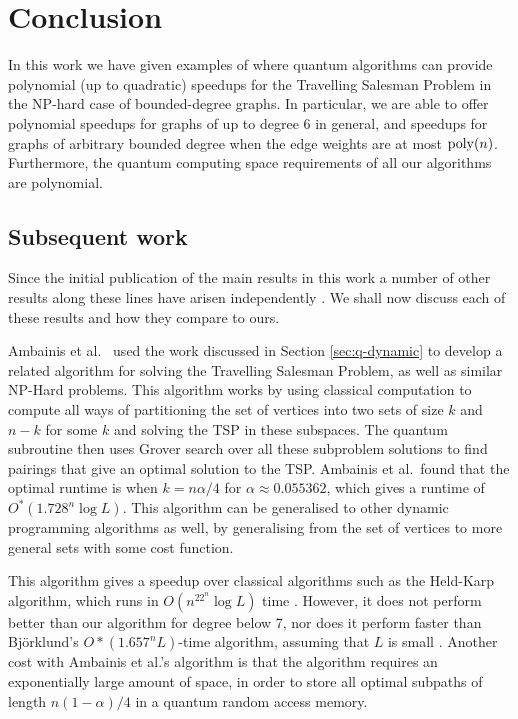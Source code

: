 \section{Conclusion}
\label{sec:tsp-conclusion}

In this work we have given examples of where quantum algorithms can provide polynomial (up to quadratic) speedups for the Travelling Salesman Problem in the NP-hard case of bounded-degree graphs. In particular, we are able to offer polynomial speedups for graphs of up to degree 6 in general, and speedups for graphs of arbitrary bounded degree when the edge weights are at most $\operatorname{poly}(n)$. Furthermore, the quantum computing space requirements of all our algorithms are polynomial.

\subsection{Subsequent work}

Since the initial publication of the main results in this work a number of other results along these lines have arisen independently \cite{ambainis2018, ronagh2019, ge2019}. We shall now discuss each of these results and how they compare to ours.

Ambainis et al.~\cite{ambainis2018} used the work discussed in Section \ref{sec:q-dynamic} to develop a related algorithm for solving the Travelling Salesman Problem, as well as similar NP-Hard problems. This algorithm works by using classical computation to compute all ways of partitioning the set of vertices into two sets of size $k$ and $n-k$ for some $k$ and solving the TSP in these subspaces. The quantum subroutine then uses Grover search over all these subproblem solutions to find pairings that give an optimal solution to the TSP. Ambainis et al.\ found that the optimal runtime is when $k=n\alpha/4$ for $\alpha\approx0.055362$, which gives a runtime of $O^*(1.728^n\log L)$. This algorithm can be generalised to other dynamic programming algorithms as well, by generalising from the set of vertices to more general sets with some cost function.

This algorithm gives a speedup over classical algorithms such as the Held-Karp algorithm, which runs in $O(n^22^n\log L)$ time \cite{held1962}. However, it does not perform better than our algorithm for degree below 7, nor does it perform faster than Bj\"orklund's $O*(1.657^nL)$-time algorithm, assuming that $L$ is small \cite{bjorklund14}. Another cost with Ambainis et al.'s algorithm is that the algorithm requires an exponentially large amount of space, in order to store all optimal subpaths of length $n(1-\alpha)/4$ in a quantum random access memory.

